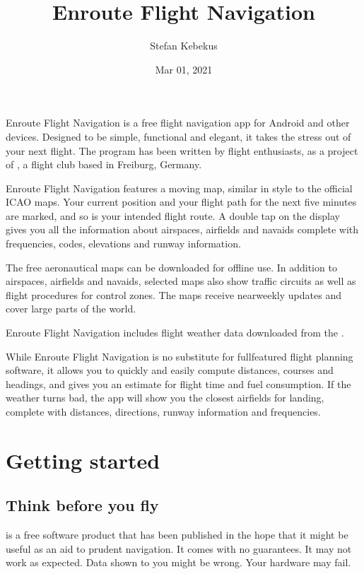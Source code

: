 \documentclass[letterpaper,10pt,english]{sphinxmanual}
\title{Enroute Flight Navigation}
\date{Mar 01, 2021}
\author{Stefan Kebekus}
\let\sphinxpxdimen\pdfpxdimen\else\newdimen\sphinxpxdimen
\begin{document}
\pagestyle{empty}
\sphinxmaketitle
\pagestyle{plain}
\sphinxtableofcontents
\pagestyle{normal}
\label{\detokenize{index::doc}}


\noindent{\hspace*{\fill}\sphinxincludegraphics[width=100\sphinxpxdimen]{{de.akaflieg_freiburg.enroute}.png}\hspace*{\fill}}

\sphinxAtStartPar
Enroute Flight Navigation is a free flight navigation app for Android and other
devices. Designed to be simple, functional and elegant, it takes the stress out
of your next flight. The program has been written by flight enthusiasts, as a
project of , a flight club
based in Freiburg, Germany.

\sphinxAtStartPar
Enroute Flight Navigation features a moving map, similar in style to the
official ICAO maps. Your current position and your flight path for the next five
minutes are marked, and so is your intended flight route. A double tap on the
display gives you all the information about airspaces, airfields and navaids \textendash{}
complete with frequencies, codes, elevations and runway information.

\sphinxAtStartPar
The free aeronautical maps can be downloaded for offline use. In addition to
airspaces, airfields and navaids, selected maps also show traffic circuits as
well as flight procedures for control zones. The maps receive near\sphinxhyphen{}weekly
updates and cover large parts of the world.

\sphinxAtStartPar
Enroute Flight Navigation includes flight weather data downloaded from the
.

\sphinxAtStartPar
While Enroute Flight Navigation is no substitute for full\sphinxhyphen{}featured flight
planning software, it allows you to quickly and easily compute distances,
courses and headings, and gives you an estimate for flight time and fuel
consumption. If the weather turns bad, the app will show you the closest
airfields for landing, complete with distances, directions, runway information
and frequencies.

\part{Getting started}


\chapter{Think before you fly}
\label{\detokenize{01-intro/think:think-before-you-fly}}\label{\detokenize{01-intro/think::doc}}
\sphinxAtStartPar
{} is a free software product that has been published
in the hope that it might be useful as an aid to prudent navigation.  It comes
with no guarantees.  It may not work as expected.  Data shown to you might be
wrong.  Your hardware may fail.
\end{document}
